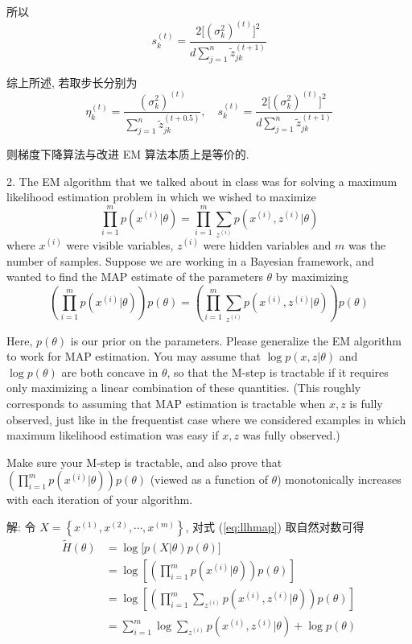 \documentclass[openany]{ctexbook}
\theoremstyle{kaiti}
\theoremstyle{normal}
\begin{document}
所以
\begin{equation}
  s_k^{(t)}=\frac{2\big[(\sigma_k^2)^{(t)}\big]^2}{\displaystyle d\sum_{j=1}^n\tilde{z}_{jk}^{(t+1)}}
\end{equation}

综上所述, 若取步长分别为
\begin{equation}
  \eta_k^{(t)}=\frac{(\sigma_k ^2)^{(t)}}{\displaystyle\sum_{j=1}^n\tilde{z}_{jk}^{(t+0.5)}},\quad s_k^{(t)}=\frac{2\big[(\sigma_k^2)^{(t)}\big]^2}{\displaystyle d\sum_{j=1}^n\tilde{z}_{jk}^{(t+1)}}
\end{equation}

则梯度下降算法与改进 EM 算法本质上是等价的.

2. The EM algorithm that we talked about in class was for solving a maximum likelihood estimation problem in which we wished to maximize
\begin{equation}
  \prod_{i = 1}^mp(x^{(i)}|\theta) = \prod_{i = 1}^m \sum_{z^{(i)}}p(x^{(i)},z^{(i)}|\theta)
\end{equation}
where $x^{(i)}$ were visible variables, $z^{(i)}$ were hidden variables and $m$ was the number of samples. Suppose we are working in a Bayesian framework, and wanted to find the MAP estimate of the parameters $\theta$ by maximizing
\begin{equation}
  \left(\prod_{i = 1}^mp(x^{(i)}|\theta)\right)p(\theta) = \left(\prod_{i = 1}^m \sum_{z^{(i)}}p(x^{(i)},z^{(i)}|\theta)\right)p(\theta)
  \label{eq:llhmap}
\end{equation}

Here, $p(\theta)$ is our prior on the parameters. Please generalize the EM algorithm to work for MAP estimation. You may assume that $\log p(x,z|\theta)$ and $\log p(\theta)$ are both concave in $\theta$, so that the M-step is tractable if it requires only maximizing a linear combination of these quantities. (This roughly corresponds to assuming that MAP estimation is tractable when $x, z$ is fully observed, just like in the frequentist case where we considered examples in which maximum likelihood estimation was easy if $x, z$ was fully observed.)

Make sure your M-step is tractable, and also prove that $\displaystyle\left(\prod_{i = 1}^mp(x^{(i)}|\theta)\right)p(\theta)$ (viewed as a function of $\theta$) monotonically increases with each iteration of your algorithm.

解: 令 $X=\left\{x^{(1)},x^{(2)},\cdots,x^{(m)}\right\}$, 对式 (\ref{eq:llhmap}) 取自然对数可得
\begin{equation}
  \begin{aligned}
    \tilde{H}(\theta)
    &=\log\big[p(X|\theta)p(\theta)\big]\\
    &=\log\left[\left(\prod_{i = 1}^mp(x^{(i)}|\theta)\right)p(\theta)\right]\\
    &=\log\left[\left(\prod_{i = 1}^m \sum_{z^{(i)}}p(x^{(i)},z^{(i)}|\theta)\right)p(\theta)\right]\\
    &=\sum_{i=1}^m\log\sum_{z^{(i)}}p\left(x^{(i)},z^{(i)}|\theta\right)+\log p(\theta)\\
  \end{aligned}
\end{equation}
\end{document}
